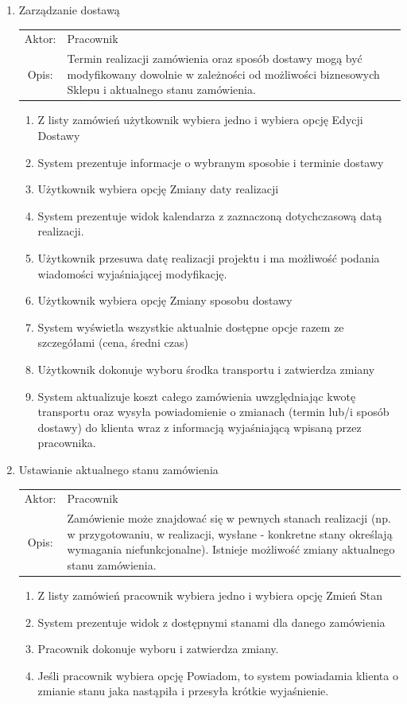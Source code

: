 \begin{enumerate}
  \item Zarządzanie dostawą\\
  \begin{tabularx}{\linewidth}{c X}
  Aktor: & Pracownik \\
  Opis: & Termin realizacji zamówienia oraz sposób dostawy mogą być
  modyfikowany dowolnie w zależności od możliwości biznesowych Sklepu i
  aktualnego stanu zamówienia.
  \end{tabularx}
	\begin{enumerate}
	  \item Z listy zamówień użytkownik wybiera jedno i wybiera opcję Edycji
	  Dostawy
	  \item System prezentuje informacje o wybranym sposobie i terminie dostawy
	  \item Użytkownik wybiera opcję Zmiany daty realizacji
	  \item System prezentuje widok kalendarza z zaznaczoną dotychczasową datą
	  realizacji.
	  \item Użytkownik przesuwa datę realizacji projektu i ma możliwość podania
	  wiadomości wyjaśniającej modyfikację.
	  \item Użytkownik wybiera opcję Zmiany sposobu dostawy
	  \item System wyświetla wszystkie aktualnie dostępne opcje razem ze
	  szczegółami (cena, średni czas)
	  \item Użytkownik dokonuje wyboru środka transportu i zatwierdza zmiany
	  \item System aktualizuje koszt całego zamówienia uwzględniając kwotę
	  transportu oraz wysyła powiadomienie o zmianach (termin lub/i sposób dostawy)
	  do klienta wraz z informacją wyjaśniającą wpisaną przez pracownika.
	\end{enumerate}

  \item Ustawianie aktualnego stanu zamówienia\\
  \begin{tabularx}{\linewidth}{c X}
  Aktor: & Pracownik \\
  Opis: & Zamówienie może znajdować się w pewnych stanach realizacji (np. w
  przygotowaniu, w realizacji, wysłane - konkretne stany określają wymagania
  niefunkcjonalne). Istnieje możliwość zmiany aktualnego stanu zamówienia.
  \end{tabularx}
	\begin{enumerate}
	  \item Z listy zamówień pracownik wybiera jedno i wybiera opcję Zmień Stan
	  \item System prezentuje widok z dostępnymi stanami dla danego zamówienia
	  \item Pracownik dokonuje wyboru i zatwierdza zmiany.
	  \item Jeśli pracownik wybiera opcję Powiadom, to system powiadamia klienta o
	  zmianie stanu jaka nastąpiła i przesyła krótkie wyjaśnienie.
	\end{enumerate}
	 
\end{enumerate}
